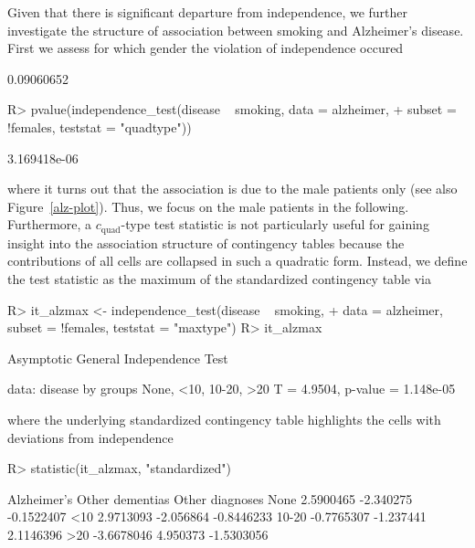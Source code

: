 \documentclass{article}
\newenvironment{Schunk}{}{}
\begin{document}
Given that there is significant departure from independence, we further
investigate the structure of association between smoking and Alzheimer's
disease. First we assess for which gender the violation of independence 
occured
\begin{Schunk}
\begin{Soutput}
[1] 0.09060652
\end{Soutput}
\begin{Sinput}
R> pvalue(independence_test(disease ~ smoking, data = alzheimer, 
+     subset = !females, teststat = "quadtype"))
\end{Sinput}
\begin{Soutput}
[1] 3.169418e-06
\end{Soutput}
\end{Schunk}
where it turns out that the association is due to the male patients only
(see also Figure~\ref{alz-plot}). Thus, we focus on the male patients in 
the following.
Furthermore, a $c_$-type test statistic is not particularly useful 
for gaining insight into the association structure of contingency tables
because the contributions of all cells are collapsed in such a quadratic form.
Instead, we define the test statistic as the maximum of the 
standardized contingency table via
\begin{Schunk}
\begin{Sinput}
R> it_alzmax <- independence_test(disease ~ smoking, 
+     data = alzheimer, subset = !females, teststat = "maxtype")
R> it_alzmax
\end{Sinput}
\begin{Soutput}
	Asymptotic General Independence Test

data:  disease by groups None, <10, 10-20, >20 
T = 4.9504, p-value = 1.148e-05
\end{Soutput}
\end{Schunk}
where the underlying standardized contingency table highlights the cells with
deviations from independence
\begin{Schunk}
\begin{Sinput}
R> statistic(it_alzmax, "standardized")
\end{Sinput}
\begin{Soutput}
      Alzheimer's Other dementias Other diagnoses
None    2.5900465       -2.340275      -0.1522407
<10     2.9713093       -2.056864      -0.8446233
10-20  -0.7765307       -1.237441       2.1146396
>20    -3.6678046        4.950373      -1.5303056
\end{Soutput}
\end{Schunk}
\end{document}
